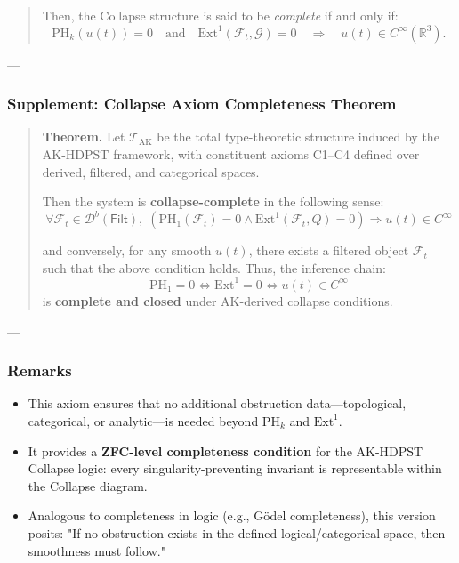 \documentclass[11pt]{article}
\begin{document}
\begin{axiom}
\begin{axiom}
{{\begin{quote}
Then, the Collapse structure is said to be \emph{complete} if and only if:
\[
\mathrm{PH}_k(u(t)) = 0 \quad \text{and} \quad \mathrm{Ext}^1(\mathcal{F}_t, \mathcal{G}) = 0 \quad \Longrightarrow \quad u(t) \in C^\infty(\mathbb{R}^3).
\]
\end{quote}

---

\subsubsection*{Supplement: Collapse Axiom Completeness Theorem}

\begin{quote}
\textbf{Theorem.}  
Let \( \mathcal{T}_{\text{AK}} \) be the total type-theoretic structure induced by the AK-HDPST framework,  
with constituent axioms C1–C4 defined over derived, filtered, and categorical spaces.

Then the system is \textbf{collapse-complete} in the following sense:
\[
\forall \mathcal{F}_t \in \mathcal{D}^b(\mathsf{Filt}),\;
\left( \mathrm{PH}_1(\mathcal{F}_t) = 0 \land \mathrm{Ext}^1(\mathcal{F}_t, Q) = 0 \right)
\Rightarrow u(t) \in C^\infty
\]

and conversely, for any smooth \( u(t) \), there exists a filtered object \( \mathcal{F}_t \) such that the above condition holds.  
Thus, the inference chain:
\[
\mathrm{PH}_1 = 0 \Leftrightarrow \mathrm{Ext}^1 = 0 \Leftrightarrow u(t) \in C^\infty
\]
is \textbf{complete and closed} under AK-derived collapse conditions.
\end{quote}

---

\subsubsection*{Remarks}

\begin{itemize}
  \item This axiom ensures that no additional obstruction data—topological, categorical, or analytic—is needed beyond \(\mathrm{PH}_k\) and \(\mathrm{Ext}^1\).
  \item It provides a \textbf{ZFC-level completeness condition} for the AK-HDPST Collapse logic:  
  every singularity-preventing invariant is representable within the Collapse diagram.
  \item Analogous to completeness in logic (e.g., Gödel completeness), this version posits:  
  "If no obstruction exists in the defined logical/categorical space, then smoothness must follow."
\end{itemize}

}}
\end{axiom}
\end{axiom}
\end{document}
